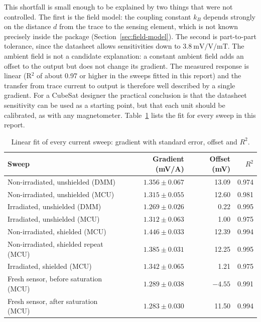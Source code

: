 \documentclass[12pt,a4paper]{article}
\begin{document}
This shortfall is small enough to be explained by two things that were not controlled. The first is the field model: the coupling constant $k_B$ depends strongly on the distance $d$ from the trace to the sensing element, which is not known precisely inside the package (Section~\ref{sec:field-model}). The second is part-to-part tolerance, since the datasheet allows sensitivities down to $\SI{3.8}{\milli\volt\per\volt\per\milli\tesla}$. The ambient field is not a candidate explanation: a constant ambient field adds an offset to the output but does not change its gradient. The measured response is linear (R$^2$ of about 0.97 or higher in the sweeps fitted in this report) and the transfer from trace current to output is therefore well described by a single gradient. For a CubeSat designer the practical conclusion is that the datasheet sensitivity can be used as a starting point, but that each unit should be calibrated, as with any magnetometer.  Table~\ref{tab:all-fits} lists the fit for every sweep in this report.

\begin{table}[H]
\centering
\caption{Linear fit of every current sweep: gradient with standard error, offset and $R^2$.}
\label{tab:all-fits}
\begin{tabular}{@{}lrrr@{}}
\toprule
Sweep & Gradient (mV/A) & Offset (mV) & $R^2$ \\
\midrule
Non-irradiated, unshielded (DMM) & $1.356 \pm 0.067$ & 13.09 & 0.974 \\
Non-irradiated, unshielded (MCU) & $1.315 \pm 0.055$ & 12.60 & 0.981 \\
Irradiated, unshielded (DMM) & $1.269 \pm 0.026$ & 0.22 & 0.995 \\
Irradiated, unshielded (MCU) & $1.312 \pm 0.063$ & 1.00 & 0.975 \\
Non-irradiated, shielded (MCU) & $1.446 \pm 0.033$ & 12.39 & 0.994 \\
Non-irradiated, shielded repeat (MCU) & $1.385 \pm 0.031$ & 12.25 & 0.995 \\
Irradiated, shielded (MCU) & $1.342 \pm 0.065$ & 1.21 & 0.975 \\
Fresh sensor, before saturation (MCU) & $1.289 \pm 0.038$ & $-4.55$ & 0.991 \\
Fresh sensor, after saturation (MCU) & $1.283 \pm 0.030$ & 11.50 & 0.994 \\
\bottomrule
\end{tabular}
\end{table}
\end{document}
